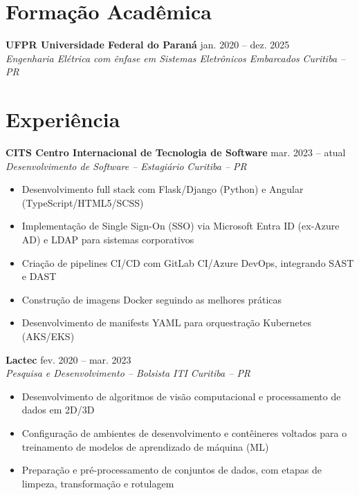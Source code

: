 \documentclass[a4paper,10pt]{article}
\newcommand{\entry}[4]{
    \noindent\textbf{#1} \hfill #2 \\
    \noindent\textit{#3} \hfill \textit{#4} \\
    \vspace{2pt}
}
\begin{document}
\vspace{0.6em}

\section*{Formação Acadêmica}\vspace{0.6em}

\entry{UFPR \textbullet{} Universidade Federal do Paraná}{\faCalendar\space jan. 2020 -- dez. 2025}{Engenharia Elétrica com ênfase em Sistemas Eletrônicos Embarcados}{Curitiba -- PR}
\vspace{-0.6em}

\section*{Experiência}\vspace{0.6em}

\entry{CITS \textbullet{} Centro Internacional de Tecnologia de Software}{\faCalendar\space mar. 2023 -- atual}{Desenvolvimento de Software -- Estagiário}{Curitiba -- PR}\vspace{-1.6em}
\begin{itemize}
    \setlength\itemsep{0em}
    \item Desenvolvimento full stack com Flask/Django (Python) e Angular (TypeScript/HTML5/SCSS)
    \item Implementação de Single Sign-On (SSO) via Microsoft Entra ID (ex-Azure AD) e LDAP para sistemas corporativos
    \item Criação de pipelines CI/CD com GitLab CI/Azure DevOps, integrando SAST e DAST
    \item Construção de imagens Docker seguindo as melhores práticas
    \item Desenvolvimento de manifests YAML para orquestração Kubernetes (AKS/EKS)
\end{itemize}

\entry{Lactec}{\faCalendar\space fev. 2020 -- mar. 2023}{Pesquisa e Desenvolvimento -- Bolsista ITI}{Curitiba -- PR}\vspace{-1.6em}
\begin{itemize}
    \setlength\itemsep{0em}
    \item Desenvolvimento de algoritmos de visão computacional e processamento de dados em 2D/3D
    \item Configuração de ambientes de desenvolvimento e contêineres voltados para o treinamento de modelos de aprendizado de máquina (ML)
    \item Preparação e pré-processamento de conjuntos de dados, com etapas de limpeza, transformação e rotulagem
\end{itemize}
\end{document}
